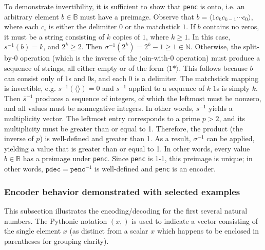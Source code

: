 \documentclass[12pt,reqno]{article}
\begin{document}
To demonstrate invertibility, it is sufficient to show that \texttt{penc} is onto, i.e. an arbitrary element $b \in \mathbb{B}$ must have a preimage. Observe that $b = \langle 1 c_{k} c_{k-1} \cdots c_0 \rangle$, where each $c_i$ is either the delimiter $0$ or the matchstick $1$. If $b$ contains no zeros, it must be a string consisting of $k$ copies of $1$, where $k \geq 1$. In this case, $s^{-1}(b) = k$, and $2^k \geq 2$. Then $\sigma^{-1}(2^k) = 2^k - 1 \geq 1\in \mathbb{N}$. Otherwise, the split-by-$0$ operation (which is the inverse of the join-with-$0$ operation) must produce a sequence of strings, all either empty or of the form $\langle 1* \rangle$. This follows because $b$ can consist only of $1$s and $0$s, and each $0$ is a delimiter. The matchstick mapping is invertible, e.g. $s^{-1}(\langle \rangle) = 0$ and $s^{-1}$ applied to a sequence of $k$ $1$s is simply $k$. Then $\overline{s}^{-1}$ produces a sequence of integers, of which the leftmost must be nonzero, and all values must be nonnegative integers. In other words, $\overline{s}^{-1}$ yields a multiplicity vector. The leftmost entry corresponds to a prime $p > 2$, and its multiplicity must be greater than or equal to 1. Therefore, the product (the inverse of $p$) is well-defined and greater than 1. As a result, $\sigma^{-1}$ can be applied, yielding a value that is greater than or equal to 1. In other words, every value $b \in \mathbb{B}$ has a preimage under \texttt{penc}. Since \texttt{penc} is 1-1, this preimage is unique; in other words, $\texttt{pdec} = \texttt{penc}^{-1}$ is well-defined and \texttt{penc} is an encoder.

\subsubsection{Encoder behavior demonstrated with selected examples}

This subsection illustrates the encoding/decoding for the first several natural numbers. The Pythonic notation $(x, )$ is used to indicate a vector consisting of the single element $x$ (as distinct from a scalar $x$ which happens to be enclosed in parentheses for grouping clarity).
\end{document}

